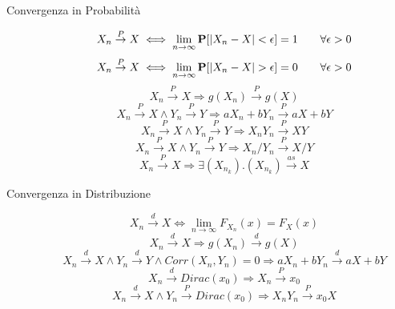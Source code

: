 \begin{description}
	\item[Convergenza in Probabilità]
		\begin{equation}
		X_{n}\overset{P}{\rightarrow}X
		\iff
		\lim_{n\rightarrow\infty}\mathbf{P}[|X_{n}-X|<\epsilon]=1
		\qquad\forall\epsilon >0
		\end{equation}
		\begin{equation}
		X_{n}\overset{P}{\rightarrow}X
		\iff
		\lim_{n\rightarrow\infty}\probability{|X_{n}-X|>\epsilon}=0
		\qquad\forall\epsilon >0
		\end{equation}
		\begin{equation}
		X_{n}\overset{P}{\rightarrow}X
		\Rightarrow
		g(X_{n})\overset{P}{\rightarrow}g(X)
		\end{equation}
		\begin{equation}
		X_{n}\overset{P}{\rightarrow}X \land Y_{n}\overset{P}{\rightarrow}Y
		\Rightarrow
		aX_{n}+bY_{n}\overset{P}{\rightarrow}aX+bY
		\end{equation}
		\begin{equation}
		X_{n}\overset{P}{\rightarrow}X \land Y_{n}\overset{P}{\rightarrow}Y
		\Rightarrow
		X_{n}Y_{n}\overset{P}{\rightarrow}XY
		\end{equation}
		\begin{equation}
		X_{n}\overset{P}{\rightarrow}X \land Y_{n}\overset{P}{\rightarrow}Y
		\Rightarrow
		X_{n}/Y_{n}\overset{P}{\rightarrow}X/Y
		\end{equation}
		\begin{equation}
		X_{n}\overset{P}{\rightarrow}X
		\Rightarrow
		\exists (X_{n_{k}}).(X_{n_{k}})\overset{as}{\rightarrow}X
		\end{equation}
		
	\item[Convergenza in Distribuzione]
		\begin{equation}
		X_{n}\overset{d}{\rightarrow}X
		\iff
		\lim_{n\rightarrow\infty}F_{X_{n}}(x)=F_{X}(x)
		\end{equation}
		\begin{equation}
		X_{n}\overset{d}{\rightarrow}X
		\Rightarrow
		g(X_{n})\overset{d}{\rightarrow}g(X)
		\end{equation}
		\begin{equation}
		X_{n}\overset{d}{\rightarrow}X \land Y_{n}\overset{d}{\rightarrow}Y \land Corr(X_{n},Y_{n})=0
		\Rightarrow
		aX_{n}+bY_{n}\overset{d}{\rightarrow}aX+bY
		\end{equation}
		\begin{equation}
		X_{n}\overset{d}{\rightarrow} Dirac(x_{0})
		\Rightarrow
		X_{n}\overset{P}{\rightarrow}x_{0}
		\end{equation}
		\begin{equation}
		X_{n}\overset{d}{\rightarrow}X \land Y_{n}\overset{P}{\rightarrow} Dirac(x_{0})
		\Rightarrow
		X_{n}Y_{n}\overset{P}{\rightarrow}x_{0}X
		\end{equation}
		

\end{description}
